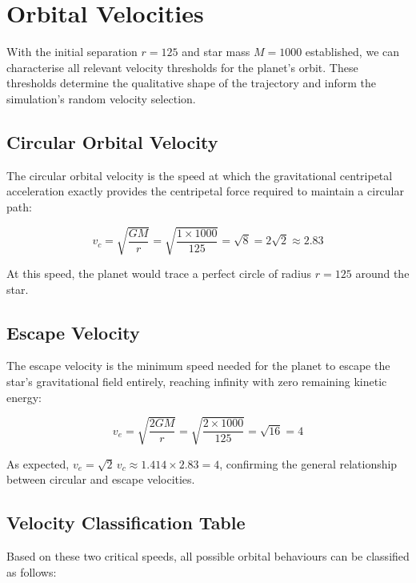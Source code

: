 \section{Orbital Velocities}

With the initial separation $r = 125$ and star mass $M = 1000$ established, we can characterise all relevant velocity thresholds for the planet's orbit. These thresholds determine the qualitative shape of the trajectory and inform the simulation's random velocity selection.

\subsection{Circular Orbital Velocity}

The circular orbital velocity is the speed at which the gravitational centripetal acceleration exactly provides the centripetal force required to maintain a circular path:

\begin{equation}
v_c = \sqrt{\frac{GM}{r}} = \sqrt{\frac{1 \times 1000}{125}} = \sqrt{8} = 2\sqrt{2} \approx 2.83
\end{equation}

At this speed, the planet would trace a perfect circle of radius $r = 125$ around the star.

\subsection{Escape Velocity}

The escape velocity is the minimum speed needed for the planet to escape the star's gravitational field entirely, reaching infinity with zero remaining kinetic energy:

\begin{equation}
v_e = \sqrt{\frac{2GM}{r}} = \sqrt{\frac{2 \times 1000}{125}} = \sqrt{16} = 4
\end{equation}

As expected, $v_e = \sqrt{2}\,v_c \approx 1.414 \times 2.83 = 4$, confirming the general relationship between circular and escape velocities.

\subsection{Velocity Classification Table}

Based on these two critical speeds, all possible orbital behaviours can be classified as follows:

